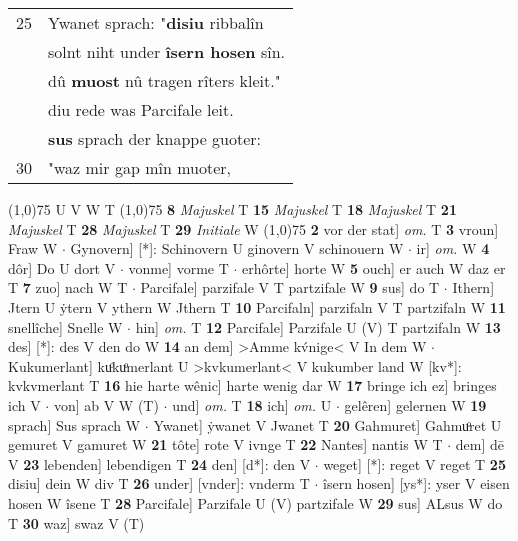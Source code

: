 \documentclass[8pt,a4paper,notitlepage]{article}
\begin{document}
\begin{table}[ht]
\begin{minipage}[t]{0.5\linewidth}
\begin{tabular}{rl}
25 & Ywanet sprach: "\textbf{disiu} ribbalîn\\ 
 & solnt niht under \textbf{îsern hosen} sîn.\\ 
 & dû \textbf{muost} nû tragen rîters kleit."\\ 
 & diu rede was Parcifale leit.\\ 
 & \textbf{sus} sprach der knappe guoter:\\ 
30 & "waz mir gap mîn muoter,\\ 
\end{tabular}
\scriptsize
\line(1,0){75} \newline
U V W T \newline
\line(1,0){75} \newline
\textbf{8} \textit{Majuskel} T  \textbf{15} \textit{Majuskel} T  \textbf{18} \textit{Majuskel} T  \textbf{21} \textit{Majuskel} T  \textbf{28} \textit{Majuskel} T  \textbf{29} \textit{Initiale} W  \newline
\line(1,0){75} \newline
\textbf{2} vor der stat] \textit{om.} T \textbf{3} vroun] Fraw W  $\cdot$ Gynovern] [*]: Schinovern U ginovern V schinouern W  $\cdot$ ir] \textit{om.} W \textbf{4} dôr] Do U dort V  $\cdot$ vonme] vorme T  $\cdot$ erhôrte] horte W \textbf{5} ouch] er auch W daz er T \textbf{7} zuo] nach W T  $\cdot$ Parcifale] parzifale V T partzifale W \textbf{9} sus] do T  $\cdot$ Ithern] Jtern U ẏtern V ythern W Jthern T \textbf{10} Parcifaln] parzifaln V T partzifaln W \textbf{11} snellîche] Snelle W  $\cdot$ hin] \textit{om.} T \textbf{12} Parcifale] Parzifale U (V) T partzifaln W \textbf{13} des] [*]: des V den do W \textbf{14} an dem] >Amme kv́nige< V In dem W  $\cdot$ Kukumerlant] kuͦkuͦmerlant U >kvkumerlant< V kukumber land W [kv*]: kvkvmerlant T \textbf{16} hie harte wênic] harte wenig dar W \textbf{17} bringe ich ez] bringes ich V  $\cdot$ von] ab V W (T)  $\cdot$ und] \textit{om.} T \textbf{18} ich] \textit{om.} U  $\cdot$ gelêren] gelernen W \textbf{19} sprach] Sus sprach W  $\cdot$ Ywanet] ẏwanet V Jwanet T \textbf{20} Gahmuret] Gahmuͦret U gemuret V gamuret W \textbf{21} tôte] rote V ivnge T \textbf{22} Nantes] nantis W T  $\cdot$ dem] dē V \textbf{23} lebenden] lebendigen T \textbf{24} den] [d*]: den V  $\cdot$ weget] [*]: reget V reget T \textbf{25} disiu] dein W div T \textbf{26} under] [vnder]: vnderm T  $\cdot$ îsern hosen] [ys*]: yser V eisen hosen W îsene T \textbf{28} Parcifale] Parzifale U (V) partzifale W \textbf{29} sus] ALsus W do T \textbf{30} waz] swaz V (T) \newline
\end{minipage}
\end{table}
\end{document}
